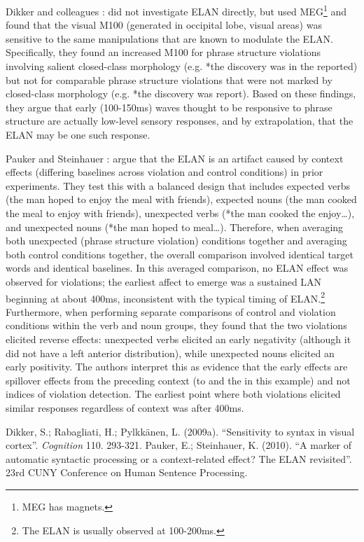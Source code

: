 \documentclass[12pt,letterpaper]{article}
\begin{document}
Dikker and colleagues \cite{Dikker}: did not investigate ELAN directly, but used MEG\footnote{MEG has magnets.} and found that the visual M100 (generated in occipital lobe, visual areas) was sensitive to the same manipulations that are known to modulate the ELAN. Specifically, they found an increased M100 for phrase structure violations involving salient closed-class morphology (e.g. *the discovery was in the reported) but not for comparable phrase structure violations that were not marked by closed-class morphology (e.g. *the discovery was report). Based on these findings, they argue that early (100-150ms) waves thought to be responsive to phrase structure are actually low-level sensory responses, and by extrapolation, that the ELAN may be one such response.

Pauker and Steinhauer \cite{Pauker}: argue that the ELAN is an artifact caused by context effects (differing baselines across violation and control conditions) in prior experiments. They test this with a balanced design that includes expected verbs (the man hoped to enjoy the meal with friends), expected nouns (the man cooked the meal to enjoy with friends), unexpected verbs (*the man cooked the enjoy…), and unexpected nouns (*the man hoped to meal…). Therefore, when averaging both unexpected (phrase structure violation) conditions together and averaging both control conditions together, the overall comparison involved identical target words and identical baselines. In this averaged comparison, no ELAN effect was observed for violations; the earliest affect to emerge was a sustained LAN beginning at about 400ms, inconsistent with the typical timing of ELAN.\footnote{The ELAN is usually observed at 100-200ms.} Furthermore, when performing separate comparisons of control and violation conditions within the verb and noun groups, they found that the two violations elicited reverse effects: unexpected verbs elicited an early negativity (although it did not have a left anterior distribution), while unexpected nouns elicited an early positivity. The authors interpret this as evidence that the early effects are spillover effects from the preceding context (to and the in this example) and not indices of violation detection. The earliest point where both violations elicited similar responses regardless of context was after 400ms.


\begin{thebibliography}{9}
 Dikker, S.; Rabagliati, H.; Pylkkänen, L. (2009a). ``Sensitivity to syntax in visual cortex''. \emph{Cognition} 110. 293-321.
 Pauker, E.; Steinhauer, K. (2010). ``A marker of automatic syntactic processing or a context-related effect? The ELAN revisited''. 23rd CUNY Conference on Human Sentence Processing.
\end{thebibliography}
\end{document}
